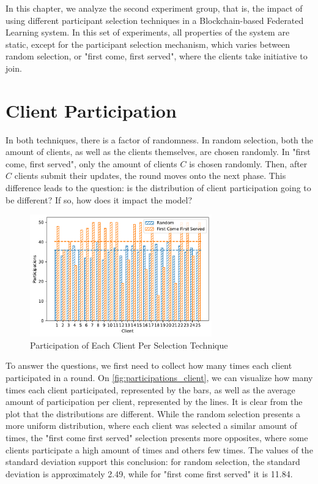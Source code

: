In this chapter, we analyze the second experiment group, that is, the impact of using different participant selection techniques in a Blockchain-based Federated Learning system. In this set of experiments, all properties of the system are static, except for the participant selection mechanism, which varies between random selection, or "first come, first served", where the clients take initiative to join.

\section{Client Participation}

In both techniques, there is a factor of randomness. In random selection, both the amount of clients, as well as the clients themselves, are chosen randomly. In "first come, first served", only the amount of clients $C$ is chosen randomly. Then, after $C$ clients submit their updates, the round moves onto the next phase. This difference leads to the question: is the distribution of client participation going to be different? If so, how does it impact the model?

\begin{figure}[!ht]
    \centering
    \centering
    \includegraphics[width=0.7\textwidth]{graphics/selection/clients.pdf}
    \caption{Participation of Each Client Per Selection Technique}
    \label{fig:participations_client}
\end{figure}

To answer the questions, we first need to collect how many times each client participated in a round. On \autoref{fig:participations_client}, we can visualize how many times each client participated, represented by the bars, as well as the average amount of participation per client, represented by the lines. It is clear from the plot that the distributions are different. While the random selection presents a more uniform distribution, where each client was selected a similar amount of times, the "first come first served" selection presents more opposites, where some clients participate a high amount of times and others few times. The values of the standard deviation support this conclusion: for random selection, the standard deviation is approximately 2.49, while for "first come first served" it is 11.84.

